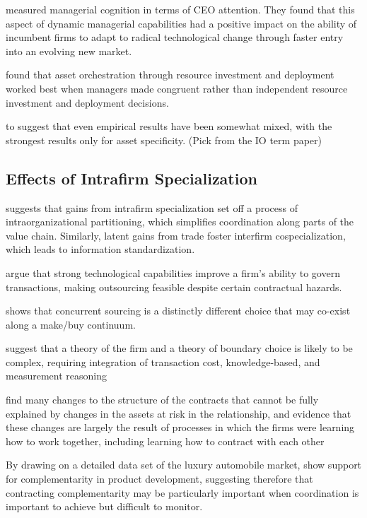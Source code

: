 \documentclass[12pt,letterpaper]{article}
\begin{document}
\cite{Eggers2009} measured managerial cognition in terms of CEO attention. They found that this aspect of dynamic managerial capabilities had a positive impact on the ability of incumbent firms to adapt to radical technological change through faster entry into an evolving new market.

\cite{Sirmon2009} found that asset orchestration through resource investment and deployment worked best when managers made congruent rather than independent resource investment and deployment decisions.

\cite{David2004} to suggest that even empirical results have been somewhat mixed, with the strongest results only for asset specificity. (Pick from the IO term paper)

\subsection{Effects of Intrafirm Specialization}
\cite{Jacobides2005b} suggests that gains from intrafirm specialization set off a process of intraorganizational partitioning, which simplifies coordination along parts of the value chain. Similarly, latent gains from trade foster interfirm cospecialization, which leads to information standardization.

\cite{Mayer2006} argue that strong technological capabilities improve a firm's ability to govern transactions, making outsourcing feasible despite certain contractual hazards.

\cite{Parmigiani2007} shows that concurrent sourcing is a distinctly different choice that may co-exist along a make/buy continuum.

\cite{Poppo1998}  suggest that a theory of the firm and a theory of boundary choice is likely to be complex, requiring integration of transaction cost, knowledge-based, and measurement reasoning

\cite{Mayer2004} find many changes to the structure of the contracts that cannot be fully explained by changes in the assets at risk in the relationship, and evidence that these changes are largely the result of processes in which the firms were learning how to work together, including learning how to contract with each other
 
By drawing on a detailed data set of the luxury automobile market, \cite{Novak2009} show support for complementarity in product development, suggesting therefore that contracting complementarity may be particularly important when coordination is important to achieve but difficult to monitor.
 
\end{document}
